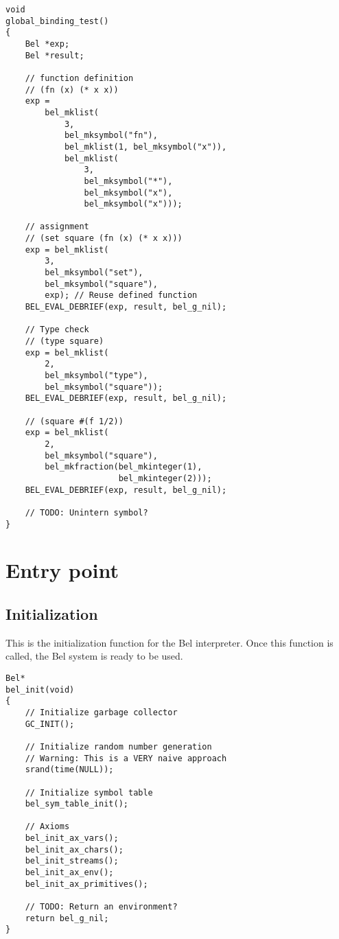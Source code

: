 \documentclass[openright,a4paper,twoside,12pt]{memoir}
\begin{document}
\begin{verbatim}
void
global_binding_test()
{
    Bel *exp;
    Bel *result;

    // function definition
    // (fn (x) (* x x))
    exp =
        bel_mklist(
            3,
            bel_mksymbol("fn"),
            bel_mklist(1, bel_mksymbol("x")),
            bel_mklist(
                3,
                bel_mksymbol("*"),
                bel_mksymbol("x"),
                bel_mksymbol("x")));
    
    // assignment
    // (set square (fn (x) (* x x)))
    exp = bel_mklist(
        3,
        bel_mksymbol("set"),
        bel_mksymbol("square"),
        exp); // Reuse defined function
    BEL_EVAL_DEBRIEF(exp, result, bel_g_nil);

    // Type check
    // (type square)
    exp = bel_mklist(
        2,
        bel_mksymbol("type"),
        bel_mksymbol("square"));
    BEL_EVAL_DEBRIEF(exp, result, bel_g_nil);
    
    // (square #(f 1/2))
    exp = bel_mklist(
        2,
        bel_mksymbol("square"),
        bel_mkfraction(bel_mkinteger(1),
                       bel_mkinteger(2)));
    BEL_EVAL_DEBRIEF(exp, result, bel_g_nil);

    // TODO: Unintern symbol?
}
\end{verbatim}

\chapter{Entry point}
\label{sec:orga5b6394}
\section{Initialization}
\label{sec:orge007c15}

This is the initialization function for the Bel interpreter. Once this
function is called, the Bel system is ready to be used.

\begin{verbatim}
Bel*
bel_init(void)
{
    // Initialize garbage collector
    GC_INIT();

    // Initialize random number generation
    // Warning: This is a VERY naive approach
    srand(time(NULL));

    // Initialize symbol table
    bel_sym_table_init();

    // Axioms
    bel_init_ax_vars();
    bel_init_ax_chars();
    bel_init_streams();
    bel_init_ax_env();
    bel_init_ax_primitives();

    // TODO: Return an environment?
    return bel_g_nil;
}
\end{verbatim}
\end{document}
